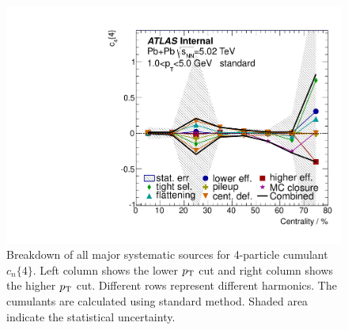\begin{figure}[H]
\includegraphics[width=.425\linewidth]{figs/chapter_appendix/sys_c4_1sub_Har4_Pt1.pdf}
\caption{Breakdown of all major systematic sources for 4-particle cumulant $c_n\{4\}$. Left column shows the lower $p_\text{T}$ cut and right column shows the higher $p_\text{T}$ cut. Different rows represent different harmonics. The cumulants are calculated using standard method. Shaded area indicate the statistical uncertainty.}
\end{figure}

